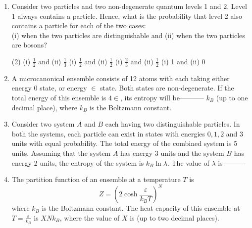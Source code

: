 \begin{enumerate}
\item Consider two particles and two non-degenerate quantum levels 1 and $2 .$ Level 1 always contains a particle. Hence, what is the probability that level 2 also contains a particle for each of the two cases:\\
(i) when the two particles are distinguishable and (ii) when the two particles are bosons?
{}
\begin{tasks}(2)
	\task[\textbf{A.}] (i) $\frac{1}{2}$ and (ii) $\frac{1}{3}$
	\task[\textbf{B.}] (i) $\frac{1}{2}$ and (ii) $\frac{1}{2}$
	\task[\textbf{C.}] (i) $\frac{2}{3}$ and (ii) $\frac{1}{2}$
	\task[\textbf{D.}] (i) 1 and (ii) 0
\end{tasks}
\item A microcanonical ensemble consists of 12 atoms with each taking either energy 0 state, or energy $\in$ state. Both states are non-degenerate. If the total energy of this ensemble is $4 \in$, its entropy will be----------- $k_{B}$ (up to one decimal place), where $k_{B}$ is the Boltzmann constant.
{}
\item Consider two system $A$ and $B$ each having two distinguishable particles. In both the systems, each particle can exist in states with energies $0,1,2$ and 3 units with equal probability. The total energy of the combined system is 5 units. Assuming that the system $A$ has energy 3 units and the system $B$ has energy 2 units, the entropy of the system is $k_{B} \ln \lambda$. The value of $\lambda$ is----------
{}
\item The partition function of an ensemble at a temperature $T$ is
$$
Z=\left(2 \cosh \frac{\varepsilon}{k_{B} T}\right)^{N}
$$
where $k_{B}$ is the Boltzmann constant. The heat capacity of this ensemble at $T=\frac{\varepsilon}{k_{B}}$ is $X N k_{B}$, where the value of $X$ is (up to two decimal places).
{}
\end{enumerate}	
\setlength\arrayrulewidth{1pt}
